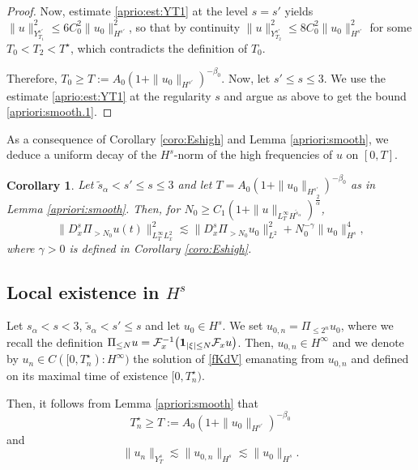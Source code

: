 \documentclass{amsart}
\newtheorem{corollary}[theorem]{Corollary}
\theoremstyle{definition}
\theoremstyle{remark}
\numberwithin{equation}{section}
\begin{document}
\begin{proof}
Now, estimate \eqref{aprio:est:YT1} at the level $s=s'$ yields $\|u\|_{Y_{T_1}^{s'}}^2 \le 6C_0^2 \|u_0\|_{H^{s'}}^2$, so that by continuity $\|u\|_{Y_{T_2}^{s'}}^2 \le 8C_0^2 \|u_0\|_{H^{s'}}^2$ for some $T_0<T_2<T^\star$, which contradicts the definition of $T_0$. 

Therefore, $T_0 \ge T:=A_0 (1+\|u_0\|_{H^{s'}})^{-\beta_0}$. Now, let $s' \le s \le 3$. We use the estimate \eqref{aprio:est:YT1} at the regularity $s$ and argue as above to get the bound \eqref{apriori:smooth.1}. 
\end{proof}

As a consequence of Corollary \ref{coro:Eshigh} and Lemma \ref{apriori:smooth}, we deduce a uniform decay of the $H^s$-norm  of the high frequencies of $ u $ on  $ [0,T] $.

\begin{corollary} \label{apriori:high}
Let $\widetilde{s}_{\alpha}<s' \le s \le 3$ and let $T= A_0 (1+\|u_0\|_{H^{s'}})^{-\beta_0}$ as in Lemma \ref{apriori:smooth}. Then, for $N_0\ge  C_1 (1+\|u\|_{L^\infty_TH^{\widetilde{s}_\alpha}})^{\frac 2 \alpha}$,
\begin{equation} \label{apriori:high.1}
\|D^s_x\Pi_{>N_0}u(t)\|_{L^\infty_TL^2_x}^2 \lesssim \|D^s_x\Pi_{>N_0}u_0\|_{L^2}^2+N_0^{-\gamma}\|u_0\|_{H^{s}}^4 ,
\end{equation}
where $\gamma>0$ is defined in Corollary \ref{coro:Eshigh}.
\end{corollary}

\subsection{Local existence in $H^s$} Let $s_\alpha<s <3$, $\widetilde{s}_\alpha<s'\le s$ and let $u_0 \in H^s$. We set $u_{0,n}=\Pi_{\le 2^n}u_0$, where we recall the definition $\Pi_{ \le N}u=\mathcal{F}^{-1}_x\big({\bf 1}_{|\xi| \le N}\mathcal{F}_xu\big)$.  Then, $u_{0,n} \in H^\infty$ and we denote by $u_n \in C([0,T_n^\star): H^\infty)$ the solution of \eqref{fKdV} emanating from $u_{0,n}$ and defined on its maximal time of existence $[0,T_n^\star)$.  

Then, it follows from Lemma \ref{apriori:smooth} that
\begin{equation} \label{def:T}
T_n^\star \ge T:=A_0 (1+\|u_0\|_{H^{s'}})^{-\beta_0}
\end{equation} 
and
\begin{equation} \label{bound:Ys}
\|u_n\|_{Y^{s}_T} \lesssim \|u_{0,n}\|_{H^{s}} \lesssim  \|u_{0}\|_{H^{s}}.
\end{equation}
\end{document}
